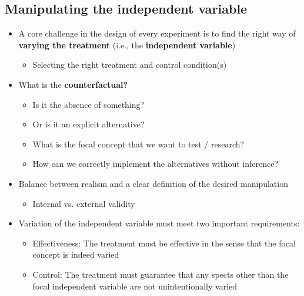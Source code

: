 \documentclass[10pt]{article}
\begin{document}
\subsection{Manipulating the independent variable}
\begin{itemize}
    \item A core challenge in the design of every experiment is to find the right way of \textbf{varying the treatment} (i.e., the \textbf{independent variable})
    \begin{itemize}
        \item Selecting the right treatment and control condition(s)
    \end{itemize}
    \item What is the \textbf{counterfactual?}
    \begin{itemize}
        \item Is it the absence of something?
        \item Or is it an explicit alternative?
        \item What is the focal concept that we want to test / research?
        \item How can we correctly implement the alternatives without inference?
    \end{itemize}
    \item Balance between realism and a clear definition of the desired manipulation
    \begin{itemize}
        \item Internal vs. external validity
    \end{itemize}
    \item Variation of the independent variable must meet two important requirements: 
    \begin{itemize}
        \item Effectiveness: The treatment must be effective in the sense that the focal concept is indeed varied 
        \item Control: The treatment must guarantee that any spects other than the focal independent variable are not unintentionally varied 
    \end{itemize}
\end{itemize}
\end{document}
